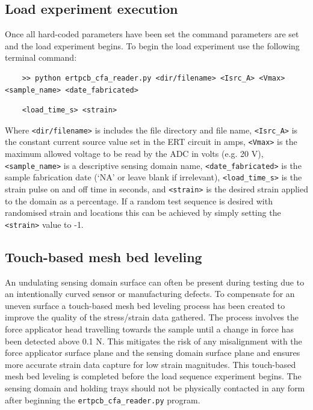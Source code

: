 \subsection{Load experiment execution}
Once all hard-coded parameters have been set the command parameters are set and the load experiment begins. To begin the load experiment use the following terminal command:
\begin{verbatim}
	>> python ertpcb_cfa_reader.py <dir/filename> <Isrc_A> <Vmax> <sample_name> <date_fabricated>
\end{verbatim}
\vspace{-1cm}
\begin{verbatim}
	<load_time_s> <strain>
\end{verbatim}

Where \verb|<dir/filename>| is includes the file directory and file name, \verb|<Isrc_A>| is the constant current source value set in the ERT circuit in amps, \verb|<Vmax>| is the maximum allowed voltage to be read by the ADC in volts (e.g. 20 V), \verb|<sample_name>| is a descriptive sensing domain name, \verb|<date_fabricated>| is the sample fabrication date (`NA' or leave blank if irrelevant), \verb|<load_time_s>| is the strain pulse on and off time in seconds, and \verb|<strain>| is the desired strain applied to the domain as a percentage. If a random test sequence is desired with randomised strain and locations this can be achieved by simply setting the \verb|<strain>| value to -1.


\subsection{Touch-based mesh bed leveling}
An undulating sensing domain surface can often be present during testing due to an intentionally curved sensor or manufacturing defects. To compensate for an uneven surface a touch-based mesh bed leveling process has been created to improve the quality of the stress/strain data gathered. The process involves the force applicator head travelling towards the sample until a change in force has been detected above 0.1 N. This mitigates the risk of any misalignment with the force applicator surface plane and the sensing domain surface plane and ensures more accurate strain data capture for low strain magnitudes. This touch-based mesh bed leveling is completed before the load sequence experiment begins. The sensing domain and holding trays should not be physically contacted in any form after beginning the \verb|ertpcb_cfa_reader.py| program.



